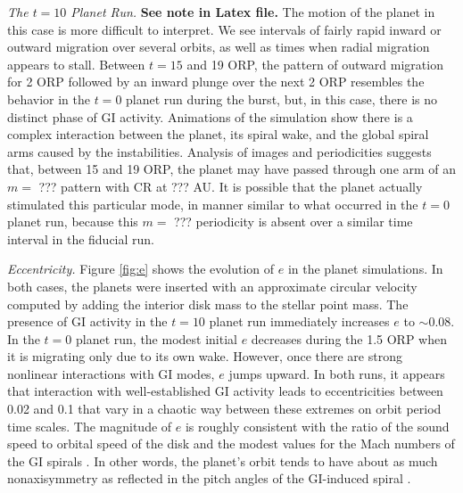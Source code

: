 \documentclass[12pt,manuscript,authoryear]{aastex}
\begin{document}
{\it The $t = 10$ Planet Run.} {\bf See note in Latex file.} The motion of the planet in this case is more difficult to interpret. We see intervals of fairly rapid inward or outward migration over several orbits, as well as times when radial migration appears to stall. Between $t = 15$ and 19 ORP, the pattern of outward migration for 2 ORP followed by an inward plunge over the next 2 ORP resembles the behavior in the $t = 0$ planet run during the burst, but, in this case, there is no distinct phase of GI activity. Animations of the simulation show there is a complex interaction between the planet, its spiral wake, and the global spiral arms caused by the instabilities. Analysis of images and periodicities suggests that, between 15 and 19 ORP, the planet may have passed through one arm of an $m =$ ??? pattern with CR at ??? AU. It is possible that the planet actually stimulated this particular mode, in manner similar to what occurred in the $t = 0$ planet run, because this $m =$ ??? periodicity is absent over a similar time interval in the fiducial run.

{\it Eccentricity.} Figure \ref{fig:e} shows the evolution of $e$ in the planet simulations. In both cases, the planets were inserted with an approximate circular velocity computed by adding the interior disk mass to the stellar point mass. The presence of GI activity in the $t = 10$ planet run immediately increases $e$ to $\sim 0.08$. In the $t = 0$ planet run, the modest initial $e$ decreases during the 1.5 ORP when it is migrating only due to its own wake. However, once there are strong nonlinear interactions with GI modes, $e$ jumps upward. In both runs, it appears that interaction with well-established GI activity leads to eccentricities between 0.02 and 0.1 that vary in a chaotic way between these extremes on orbit period time scales. The magnitude of $e$ is roughly consistent with the ratio of the sound speed to orbital speed of the disk and the modest values for the Mach numbers of the GI spirals \citep{boley2006a,boley2008}. In other words, the planet's orbit tends to have about as much nonaxisymmetry as reflected in the pitch angles of the GI-induced spiral \citep{cossins2009}.
\end{document}
